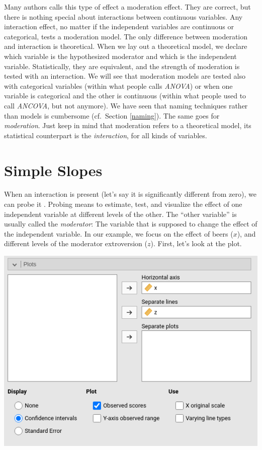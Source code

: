 \documentclass[
]{book}
\begin{document}
Many authors calls this type of effect a moderation effect. They are correct, but there is nothing special about interactions between continuous variables. Any interaction effect, no matter if the independent variables are continuous or categorical, tests a moderation model. The only difference between moderation and interaction is theoretical. When we lay out a theoretical model, we declare which variable is the hypothesized moderator and which is the independent variable. Statistically, they are equivalent, and the strength of moderation is tested with an interaction. We will see that moderation models are tested also with categorical variables (within what people calls \emph{ANOVA}) or when one variable is categorical and the other is continuous (within what people used to call \emph{ANCOVA}, but not anymore). We have seen that naming techniques rather than models is cumbersome (cf.~Section \ref{naming}). The same goes for \emph{moderation}. Just keep in mind that moderation refers to a theoretical model, its statistical counterpart is the \emph{interaction}, for all kinds of variables.

\hypertarget{simpleslopes}{%
\section{Simple Slopes}\label{simpleslopes}}

When an interaction is present (let's say it is significantly different from zero), we can probe it \citep{aiken1991multiple}. Probing means to estimate, test, and visualize the effect of one independent variable at different levels of the other. The ``other variable'' is usually called the \emph{moderator}: The variable that is supposed to change the effect of the independent variable. In our example, we focus on the effect of beers (\(x\)), and different levels of the moderator extroversion (\(z\)). First, let's look at the plot.

\includegraphics[width=0.7\linewidth]{bookletpics/2_input10}
\end{document}
